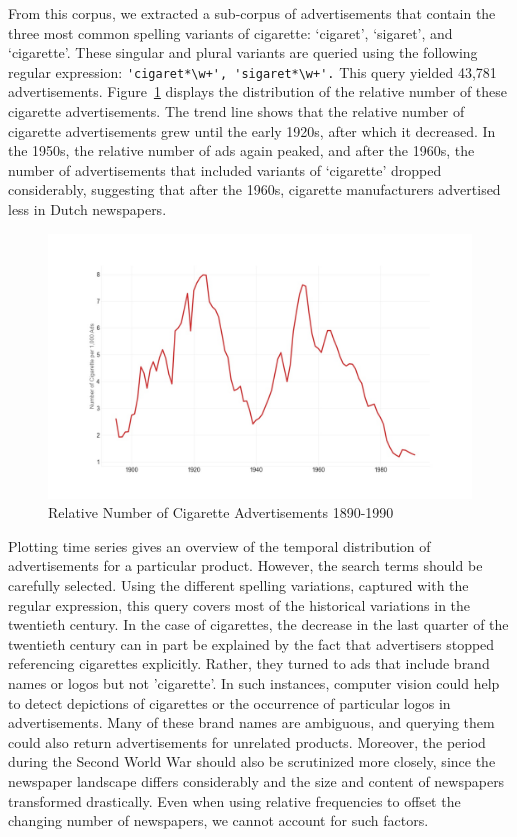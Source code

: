 \documentclass[USenglish]{article}
\begin{document}
From this corpus, we extracted a sub-corpus of advertisements that contain the three most common spelling variants of cigarette: `cigaret', `sigaret', and `cigarette'. These singular and plural variants are queried using the following regular expression: 
\verb/'cigaret*\w+', 'sigaret*\w+'./ This query yielded 43,781 advertisements. Figure~\ref{fig:cigarette_ad_curve} displays the distribution of the relative number of these cigarette advertisements. The trend line shows that the relative number of cigarette advertisements grew until the early 1920s, after which it decreased. In the 1950s, the relative number of ads again peaked, and after the 1960s, the number of advertisements that included variants of `cigarette' dropped considerably, suggesting that after the 1960s, cigarette manufacturers advertised less in Dutch newspapers.

\begin{figure}%
  \centering
  \includegraphics[width=\textwidth]{figures/cigarette_ads}%
  \caption{Relative Number of Cigarette Advertisements 1890-1990}%
  \label{fig:cigarette_ad_curve}%
\end{figure}

Plotting time series gives an overview of the temporal distribution of advertisements for a particular product. However, the search terms should be carefully selected. Using the different spelling variations, captured with the regular expression, this query covers most of the historical variations in the twentieth century. In the case of cigarettes, the decrease in the last quarter of the twentieth century can in part be explained by the fact that advertisers stopped referencing cigarettes explicitly. Rather, they turned to ads that include brand names or logos but not 'cigarette'. In such instances, computer vision could help to detect depictions of cigarettes or the occurrence of particular logos in advertisements. Many of these brand names are ambiguous, and querying them could also return advertisements for unrelated products. 
%
Moreover, the period during the Second World War should also be scrutinized more closely, since the newspaper landscape differs considerably and the size and content of newspapers transformed drastically. Even when using relative frequencies to offset the changing number of newspapers, we cannot account for such factors. 
\end{document}
